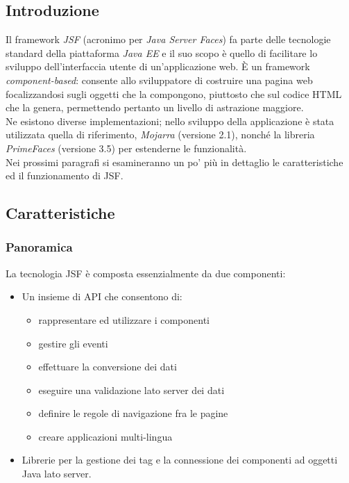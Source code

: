 \subsection{Introduzione}

Il framework \textsl{JSF} (acronimo per \textsl{Java Server Faces}) fa parte delle tecnologie standard della piattaforma \textsl{Java EE} e il suo scopo è quello di facilitare lo sviluppo dell'interfaccia utente di un'applicazione web. È un framework \textit{component-based}: consente allo sviluppatore di costruire una pagina web focalizzandosi sugli oggetti che la compongono, piuttosto che sul codice HTML che la genera, permettendo pertanto un livello di astrazione maggiore. \\
Ne esistono diverse implementazioni; nello sviluppo della applicazione è stata utilizzata quella di riferimento, \textsl{Mojarra} (versione 2.1), nonché la libreria \textsl{PrimeFaces} (versione 3.5) per estenderne le funzionalità.\\
Nei prossimi paragrafi si esamineranno un po' più in dettaglio le caratteristiche ed il funzionamento di JSF.


\subsection{Caratteristiche}

\subsubsection{Panoramica}

La tecnologia JSF è composta essenzialmente da due componenti:

\begin{itemize}
\item Un insieme di API che consentono di:
\begin{itemize}
\item rappresentare ed utilizzare i componenti
\item gestire gli eventi
\item effettuare la conversione dei dati
\item eseguire una validazione lato server dei dati
\item definire le regole di navigazione fra le pagine
\item creare applicazioni multi-lingua
\end{itemize}
\item Librerie per la gestione dei tag e la connessione dei componenti ad oggetti Java lato server.
\end{itemize}

